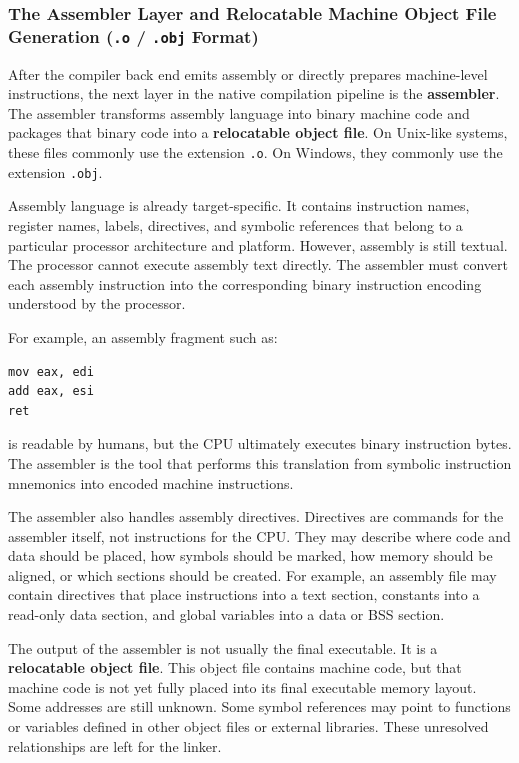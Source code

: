 \subsubsection{The Assembler Layer and Relocatable Machine Object File Generation (\texttt{.o} / \texttt{.obj} Format)}

After the compiler back end emits assembly or directly prepares machine-level instructions, the next layer in the native compilation pipeline is the \textbf{assembler}. The assembler transforms assembly language into binary machine code and packages that binary code into a \textbf{relocatable object file}. On Unix-like systems, these files commonly use the extension \texttt{.o}. On Windows, they commonly use the extension \texttt{.obj}.

Assembly language is already target-specific. It contains instruction names, register names, labels, directives, and symbolic references that belong to a particular processor architecture and platform. However, assembly is still textual. The processor cannot execute assembly text directly. The assembler must convert each assembly instruction into the corresponding binary instruction encoding understood by the processor.

For example, an assembly fragment such as:

\begin{verbatim}
mov eax, edi
add eax, esi
ret
\end{verbatim}

is readable by humans, but the CPU ultimately executes binary instruction bytes. The assembler is the tool that performs this translation from symbolic instruction mnemonics into encoded machine instructions.

The assembler also handles assembly directives. Directives are commands for the assembler itself, not instructions for the CPU. They may describe where code and data should be placed, how symbols should be marked, how memory should be aligned, or which sections should be created. For example, an assembly file may contain directives that place instructions into a text section, constants into a read-only data section, and global variables into a data or BSS section.

The output of the assembler is not usually the final executable. It is a \textbf{relocatable object file}. This object file contains machine code, but that machine code is not yet fully placed into its final executable memory layout. Some addresses are still unknown. Some symbol references may point to functions or variables defined in other object files or external libraries. These unresolved relationships are left for the linker.


